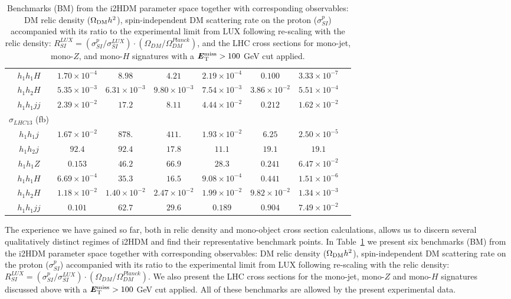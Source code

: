 \documentclass[12pt,a4paper]{article}
\newcommand {\blue} {\color{blue}}
\newcommand{\MET}{\textbf{\textit{E}$_{\rm T}^{\rm miss}$}}
\begin{document}
\begin{table}[htb]
\begin{tabular}{|c||c|c|c|c|c|c|c|}
  ${h_1h_1 H}$  		& $1.70\times 10^{-4}$  &  $8.98$  		& $4.21$  		& $2.19\times 10^{-4}$ 	&  $0.100$ 		&  $3.33\times 10^{-7}$ \\
  ${h_1h_2 H}$  		& $5.35\times 10^{-3}$  &  $6.31\times 10^{-3}$ & $9.80\times 10^{-3}$  & $7.54\times 10^{-3}$ 	&  $3.86\times 10^{-2}$ &  $5.51\times 10^{-4}$ \\
  ${h_1 h_1 jj}$		& $2.39\times 10^{-2}$	&  $17.2$  		& $8.11$  		& $4.44\times 10^{-2}$ 	&  $0.212$		&  $1.62\times 10^{-2}$ \\
 \hline 
  $\sigma_{LHC13}$ (fb) &&&&&&\\
  ${h_1 h_1 j}$  		& $1.67\times 10^{-2}$ 	&  $878.$  		& $411.$  		& $1.93\times 10^{-2}$ 	&  $6.25$ 		& $2.50\times 10^{-5} $ \\
  ${h_1 h_2 j}$  		& $92.4$      		&  $92.4$  		& $17.8$  		& $11.1$ 		&  $19.1$ 		&  $19.1$ \\
  ${h_1h_1 Z}$  		& $0.153$       	&  $46.2$  		& $66.9$  		& $28.3$ 		&  $0.241$ 		&  $6.47\times 10^{-2}$ \\
  ${h_1h_1 H}$  		& $6.69\times 10^{-4}$  &  $35.3$  		& $16.5$  		& $9.08\times 10^{-4}$ 	&  $0.441$ 		&  $1.51\times 10^{-6}$ \\
  ${h_1h_2 H}$  		& $1.18\times 10^{-2}$  &  $1.40\times 10^{-2}$ & $2.47\times 10^{-2}$  & $1.99\times 10^{-2}$ 	&  $9.82\times 10^{-2}$ &  $1.34\times 10^{-3}$ \\
  ${h_1 h_1 jj}$ 		& $0.101$	     	&  $62.7$  		& $29.6$  		& $0.189$ 		&  $0.904$ 		&  $7.49\times 10^{-2}$ \\
  \hline\hline
\end{tabular}
\caption{Benchmarks (BM) from the i2HDM parameter space
together with corresponding observables: DM relic density ($\Omega_{\rm DM} h^2$),
 spin-independent  DM scattering rate on the proton ($\sigma_{SI}^p$)
accompanied with its ratio to the experimental limit from LUX following re-scaling with the relic density: 
$R_{SI}^{LUX} =(\sigma_{SI}^p/\sigma_{SI}^{LUX})\cdot (\Omega_{DM}/\Omega_{DM}^{Planck})$,
and the LHC cross sections for mono-jet, mono-$Z$, and mono-$H$ signatures with a $\MET > 100$ GeV cut applied.
\label{tab:i2HDMbenchMarks}}
\end{table}

{\blue The experience we have gained so far, both in relic density and mono-object cross section calculations,
allows us to discern several qualitatively distinct regimes
of i2HDM and find their representative benchmark points.}
In Table~\ref{tab:i2HDMbenchMarks} we present six benchmarks (BM) from the i2HDM  parameter space
together with corresponding observables: DM relic density ($\Omega_{\rm DM} h^2$),
 spin-independent  DM scattering rate on the proton ($\sigma_{SI}^p$)
accompanied with its ratio to the experimental limit from LUX following re-scaling with the relic density: 
$R_{SI}^{LUX} =(\sigma_{SI}^p/\sigma_{SI}^{LUX})\cdot (\Omega_{DM}/\Omega_{DM}^{Planck})$.
We also present the LHC cross sections for the mono-jet, mono-$Z$ and mono-$H$ signatures
discussed above with a $\MET > 100$ GeV cut applied.
All of these benchmarks are allowed by the present experimental data.
\end{document}
